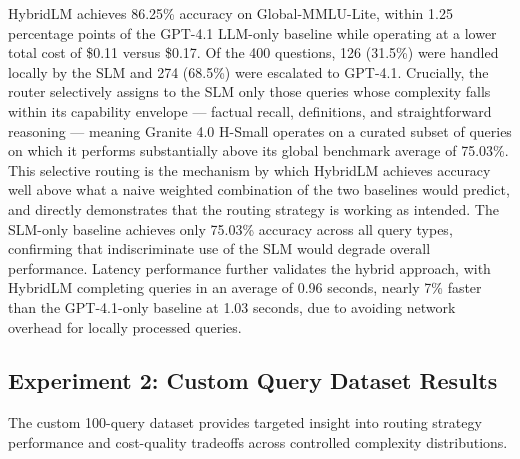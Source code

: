 HybridLM achieves 86.25\% accuracy on Global-MMLU-Lite, within 1.25 percentage points of the GPT-4.1 LLM-only baseline while operating at a lower total cost of \$0.11 versus \$0.17. Of the 400 questions, 126 (31.5\%) were handled locally by the SLM and 274 (68.5\%) were escalated to GPT-4.1. Crucially, the router selectively assigns to the SLM only those queries whose complexity falls within its capability envelope — factual recall, definitions, and straightforward reasoning — meaning Granite 4.0 H-Small operates on a curated subset of queries on which it performs substantially above its global benchmark average of 75.03\%. This selective routing is the mechanism by which HybridLM achieves accuracy well above what a naive weighted combination of the two baselines would predict, and directly demonstrates that the routing strategy is working as intended. The SLM-only baseline achieves only 75.03\% accuracy across all query types, confirming that indiscriminate use of the SLM would degrade overall performance. Latency performance further validates the hybrid approach, with HybridLM completing queries in an average of 0.96 seconds, nearly 7\% faster than the GPT-4.1-only baseline at 1.03 seconds, due to avoiding network overhead for locally processed queries.

\subsection{Experiment 2: Custom Query Dataset Results}
The custom 100-query dataset provides targeted insight into routing strategy performance and cost-quality tradeoffs across controlled complexity distributions.


